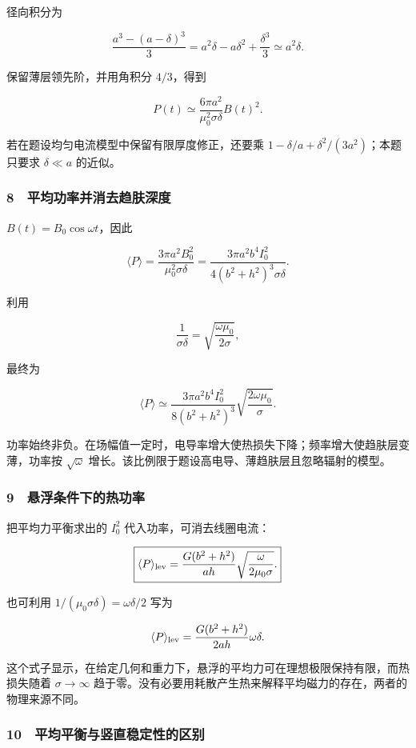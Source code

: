 \documentclass[12pt,a4paper,fontset=fandol]{ctexart}
\begin{document}
径向积分为

\[\frac{a^3-(a-\delta)^3}{3}
=a^2\delta-a\delta^2+\frac{\delta^3}{3}
\simeq a^2\delta.\]

保留薄层领先阶，并用角积分 \(4/3\)，得到

\[\boxed{P(t)\simeq
\frac{6\pi a^2}{\mu_0^2\sigma\delta}B(t)^2.}\]

若在题设均匀电流模型中保留有限厚度修正，还要乘
\(1-\delta/a+\delta^2/(3a^2)\)；本题只要求 \(\delta\ll a\) 的近似。

\subsubsection{8　平均功率并消去趋肤深度}\label{ux5e73ux5747ux529fux7387ux5e76ux6d88ux53bbux8d8bux80a4ux6df1ux5ea6}

\(B(t)=B_0\cos\omega t\)，因此

\[\langle P\rangle=
\frac{3\pi a^2B_0^2}{\mu_0^2\sigma\delta}
=\frac{3\pi a^2b^4I_0^2}
{4(b^2+h^2)^3\sigma\delta}.\]

利用

\[\frac1{\sigma\delta}=\sqrt{\frac{\omega\mu_0}{2\sigma}},\]

最终为

\[\boxed{\langle P\rangle\simeq
\frac{3\pi a^2b^4I_0^2}{8(b^2+h^2)^3}
\sqrt{\frac{2\omega\mu_0}{\sigma}}.}\]

功率始终非负。在场幅值一定时，电导率增大使热损失下降；频率增大使趋肤层变薄，功率按
\(\sqrt\omega\) 增长。该比例限于题设高电导、薄趋肤层且忽略辐射的模型。

\subsubsection{9　悬浮条件下的热功率}\label{ux60acux6d6eux6761ux4ef6ux4e0bux7684ux70edux529fux7387}

把平均力平衡求出的 \(I_0^2\) 代入功率，可消去线圈电流：

\[\boxed{\langle P\rangle_{\rm lev}
=\frac{G(b^2+h^2)}{a h}
\sqrt{\frac{\omega}{2\mu_0\sigma}}.}\]

也可利用 \(1/(\mu_0\sigma\delta)=\omega\delta/2\) 写为

\[\langle P\rangle_{\rm lev}
=\frac{G(b^2+h^2)}{2ah}\omega\delta.\]

这个式子显示，在给定几何和重力下，悬浮的平均力可在理想极限保持有限，而热损失随着
\(\sigma\to\infty\)
趋于零。没有必要用耗散产生热来解释平均磁力的存在，两者的物理来源不同。

\subsubsection{10　平均平衡与竖直稳定性的区别}\label{ux5e73ux5747ux5e73ux8861ux4e0eux7ad6ux76f4ux7a33ux5b9aux6027ux7684ux533aux522b}
\end{document}
